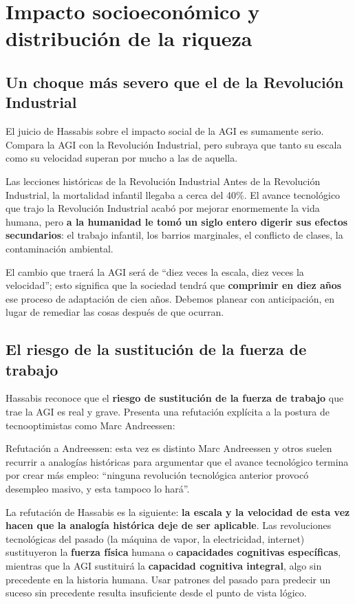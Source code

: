 \section{Impacto socioeconómico y distribución de la riqueza}

\subsection{Un choque más severo que el de la Revolución Industrial}

El juicio de Hassabis sobre el impacto social de la AGI es sumamente serio. Compara la AGI con la Revolución Industrial, pero subraya que tanto su escala como su velocidad superan por mucho a las de aquella.

\begin{importantbox}{Las lecciones históricas de la Revolución Industrial}
Antes de la Revolución Industrial, la mortalidad infantil llegaba a cerca del 40\%. El avance tecnológico que trajo la Revolución Industrial acabó por mejorar enormemente la vida humana, pero \textbf{a la humanidad le tomó un siglo entero digerir sus efectos secundarios}: el trabajo infantil, los barrios marginales, el conflicto de clases, la contaminación ambiental.

El cambio que traerá la AGI será de ``diez veces la escala, diez veces la velocidad''; esto significa que la sociedad tendrá que \textbf{comprimir en diez años} ese proceso de adaptación de cien años. Debemos planear con anticipación, en lugar de remediar las cosas después de que ocurran.
\end{importantbox}

\subsection{El riesgo de la sustitución de la fuerza de trabajo}

Hassabis reconoce que el \textbf{riesgo de sustitución de la fuerza de trabajo} que trae la AGI es real y grave. Presenta una refutación explícita a la postura de tecnooptimistas como Marc Andreessen:

\begin{warningbox}{Refutación a Andreessen: esta vez es distinto}
Marc Andreessen y otros suelen recurrir a analogías históricas para argumentar que el avance tecnológico termina por crear más empleo: ``ninguna revolución tecnológica anterior provocó desempleo masivo, y esta tampoco lo hará''.

La refutación de Hassabis es la siguiente: \textbf{la escala y la velocidad de esta vez hacen que la analogía histórica deje de ser aplicable}. Las revoluciones tecnológicas del pasado (la máquina de vapor, la electricidad, internet) sustituyeron la \textbf{fuerza física} humana o \textbf{capacidades cognitivas específicas}, mientras que la AGI sustituirá la \textbf{capacidad cognitiva integral}, algo sin precedente en la historia humana. Usar patrones del pasado para predecir un suceso sin precedente resulta insuficiente desde el punto de vista lógico.
\end{warningbox}

